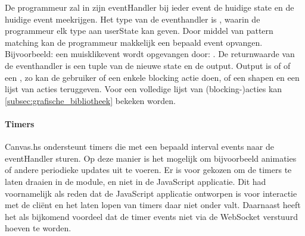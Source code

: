 De programmeur zal in zijn eventHandler bij ieder event de huidige state en de huidige event meekrijgen. Het type van de eventhandler is , waarin de programmeur elk type aan userState kan geven. Door middel van pattern matching kan de programmeur makkelijk een bepaald event opvangen. Bijvoorbeeld: een muisklikevent wordt opgevangen door: . De returnwaarde van de eventhandler is een tuple van de nieuwe state en de output. Output is of  of een , zo kan de gebruiker of een enkele blocking actie doen, of een shapen en een lijst van acties teruggeven. Voor een volledige lijst van (blocking-)acties kan \autoref{subsec:grafische_bibliotheek} bekeken worden.

\paragraph{Timers}
Canvas.hs ondersteunt timers die met een bepaald interval events naar de eventHandler sturen. Op deze manier is het mogelijk om bijvoorbeeld animaties of andere periodieke updates uit te voeren. Er is voor gekozen om de timers te laten draaien in de module, en niet in de JavaScript applicatie. Dit had voornamelijk als reden dat de JavaScript applicatie ontworpen is voor interactie met de cliënt en het laten lopen van timers daar niet onder valt. Daarnaast heeft het als bijkomend voordeel dat de timer events niet via de WebSocket verstuurd hoeven te worden.

